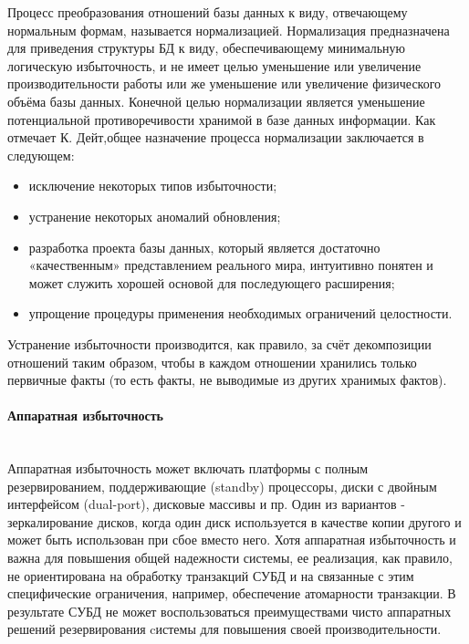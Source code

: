 Процесс преобразования отношений базы данных к виду, отвечающему нормальным формам, называется нормализацией. Нормализация предназначена для приведения структуры БД к виду, обеспечивающему минимальную логическую избыточность, и не имеет целью уменьшение или увеличение производительности работы или же уменьшение или увеличение физического объёма базы данных. Конечной целью нормализации является уменьшение потенциальной противоречивости хранимой в базе данных информации. Как отмечает К. Дейт,общее назначение процесса нормализации заключается в следующем:
\begin{itemize}
    \item исключение некоторых типов избыточности;
    \item устранение некоторых аномалий обновления;
    \item разработка проекта базы данных, который является достаточно «качественным» представлением реального мира, интуитивно понятен и может служить хорошей основой для последующего расширения;
    \item упрощение процедуры применения необходимых ограничений целостности.
\end{itemize}

Устранение избыточности производится, как правило, за счёт декомпозиции отношений таким образом, чтобы в каждом отношении хранились только первичные факты (то есть факты, не выводимые из других хранимых фактов). \\

\paragraph{Аппаратная избыточность} ~\\
Аппаратная избыточность может включать платформы с полным резервированием, поддерживающие (standby) процессоры, диски с двойным интерфейсом (dual-port), дисковые массивы и пр. Один из вариантов - зеркалирование дисков, когда один диск используется в качестве копии другого и может быть использован при сбое вместо него. Хотя аппаратная избыточность и важна для повышения общей надежности системы, ее реализация, как правило, не ориентирована на обработку транзакций СУБД и на связанные с этим специфические ограничения, например, обеспечение атомарности транзакции. В результате СУБД не может воспользоваться преимуществами чисто аппаратных решений резервирования cистемы для повышения своей производительности.

